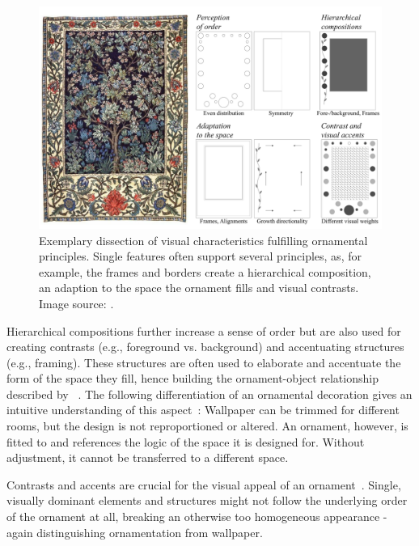 \begin{figure}
       \includegraphics[width=1\columnwidth]{figures/ornament/ornament_principles.pdf}
        \caption[Ornamentation principles]{\label{fig:ornamentation_principles} Exemplary dissection of visual characteristics fulfilling ornamental principles. Single features often support several principles, as, for example, the frames and borders create a hierarchical composition, an adaption to the space the ornament fills and visual contrasts. Image source: \cite{morris_1910_tol}.}
\end{figure}

Hierarchical compositions further increase a sense of order but are also used for creating contrasts (e.g., foreground vs. background) and accentuating structures (e.g., framing). These structures are often used to elaborate and accentuate the form of the space they fill, hence building the ornament-object relationship described by \citeauthor*{arbruzzo_2006_dec}~\cite{arbruzzo_2006_dec}. The following differentiation of an ornamental decoration gives an intuitive understanding of this aspect~\cite{arbruzzo_2006_dec}: Wallpaper can be trimmed for different rooms, but the design is not reproportioned or altered. An ornament, however, is fitted to and references the logic of the space it is designed for. Without adjustment, it cannot be transferred to a different space.

Contrasts and accents are crucial for the visual appeal of an ornament~\cite{wong_1998_cgf,ward_1896_tpo, moughtin_1999_udo}. Single, visually dominant elements and structures might not follow the underlying order of the ornament at all, breaking an otherwise too homogeneous appearance - again distinguishing ornamentation from wallpaper.

